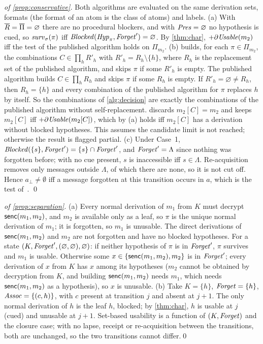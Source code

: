\begin{proof}[of \cref{prop:conservative}]
Both algorithms are evaluated on the same derivation sets, formats (the format of an atom is the class of atoms) and labels. (a) With $\overline{R}=\overline{\Pi}=\varnothing$ there are no procedural blockers, and with $\mathit{Pres}=\varnothing$ no hypothesis is cued, so $\mathit{surv}_\sigma(\pi)$ iff $\mathit{Blocked}(\mathit{Hyp}_\pi,\mathit{Forget}')=\varnothing$. By \cref{thm:char}, $+\partial\mathit{Usable}(m_2)$ iff the test of the published algorithm holds on $\Pi_{m_2}$. (b)  builds, for each $\pi\in\Pi_{m_2}$, the combinations $C\in\prod_h R'_h$ with $R'_h=R_h\setminus\{h\}$, where $R_h$ is the replacement set of the published algorithm, and skips $\pi$ if some $R'_h$ is empty. The published algorithm builds $C\in\prod_h R_h$ and skips $\pi$ if some $R_h$ is empty. If $R'_h=\varnothing\neq R_h$, then $R_h=\{h\}$ and every combination of the published algorithm for $\pi$ replaces $h$ by itself. So the combinations of \cref{alg:decision} are exactly the combinations of the published algorithm without self-replacement.  discards $m_2[C]=m_2$ and keeps $m_2[C]$ iff $+\partial\mathit{Usable}(m_2[C])$, which by (a) holds iff $m_2[C]$ has a derivation without blocked hypotheses. This assumes the candidate limit is not reached; otherwise the result is flagged partial. (c) Under Case~1, $\mathit{Blocked}(\{s\},\mathit{Forget}')=\{s\}\cap\mathit{Forget}'$, and $\mathit{Forget}'=\Lambda$ since nothing was forgotten before; with no cue present, $s$ is inaccessible iff $s\in\Lambda$. Re-acquisition removes only messages outside $\Lambda$, of which there are none, so it is not cut off. Hence $a_\bot\neq\emptyset$ iff a message forgotten at this transition occurs in $a$, which is the test of~\cite{sandu2026formal}. \qed
\end{proof}

\begin{proof}[of \cref{prop:separation}]
(a) Every normal derivation of $m_1$ from $K$ must decrypt $\mathsf{senc}(m_1,m_2)$, and $m_2$ is available only as a leaf, so $\pi$ is the unique normal derivation of $m_1$; it is forgotten, so $m_1$ is unusable. The direct derivations of $\mathsf{senc}(m_1,m_2)$ and $m_2$ are not forgotten and have no blocked hypotheses. For a state $(K,\mathit{Forget}',(\varnothing,\varnothing),\varnothing)$: if neither hypothesis of $\pi$ is in $\mathit{Forget}'$, $\pi$ survives and $m_1$ is usable. Otherwise some $x\in\{\mathsf{senc}(m_1,m_2),m_2\}$ is in $\mathit{Forget}'$; every derivation of $x$ from $K$ has $x$ among its hypotheses ($m_2$ cannot be obtained by decryption from $K$, and building $\mathsf{senc}(m_1,m_2)$ needs $m_1$, which needs $\mathsf{senc}(m_1,m_2)$ as a hypothesis), so $x$ is unusable.
(b) Take $K=\{h\}$, $\mathit{Forget}=\{h\}$, $\mathit{Assoc}=\{(c,h)\}$, with $c$ present at transition $j$ and absent at $j+1$. The only normal derivation of $h$ is the leaf $h$, blocked; by \cref{thm:char}, $h$ is usable at $j$ (cued) and unusable at $j+1$. Set-based usability is a function of $(K,\mathit{Forget})$ and the closure case; with no lapse, receipt or re-acquisition between the transitions, both are unchanged, so the two transitions cannot differ.\qed
\end{proof}

